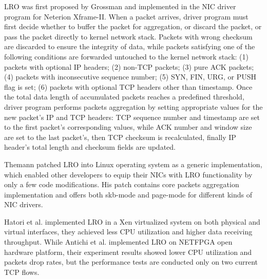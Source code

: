 \documentclass[conference]{IEEEtran}
\begin{document}
LRO was first proposed by Grossman\cite{grossman2005large} and implemented in the NIC driver program for Neterion Xframe-II. When a packet arrives, driver program must first decide whether to buffer the packet for aggregation, or discard the packet, or pass the packet directly to kernel network stack. Packets with wrong checksum are discarded to ensure the integrity of data, while packets satisfying one of the following conditions are forwarded untouched to the kernel network stack: (1) packets with optional IP headers; (2) non-TCP packets; (3) pure ACK packets; (4) packets with inconsecutive sequence number; (5) SYN, FIN, URG, or PUSH flag is set; (6) packets with optional TCP headers other than timestamp. Once the total data length of accumulated packets reaches a predefined threshold, driver program performs packets aggregation by setting appropriate values for the new packet's IP and TCP headers: TCP sequence number and timestamp are set to the first packet's corresponding values, while ACK number and window size are set to the last packet's, then TCP checksum is recalculated, finally IP header's total length and checksum fields are updated.

Themann\cite{theman2007lro} patched LRO into Linux operating system as a generic implementation, which enabled other developers to equip their NICs with LRO functionality by only a few code modifications. His patch contains core packets aggregation implementation and offers both skb-mode and page-mode for different kinds of NIC drivers.

Hatori\cite{hatori2008implementation} et al. implemented LRO in a Xen virtualized system on both physical and virtual interfaces, they achieved less CPU utilization and higher data receiving throughput. While Antichi\cite{antichi2013implementation} et al. implemented LRO on NETFPGA open hardware platform, their experiment results showed lower CPU utilization and packets drop rates, but the performance tests are conducted only on two current TCP flows.
\end{document}
